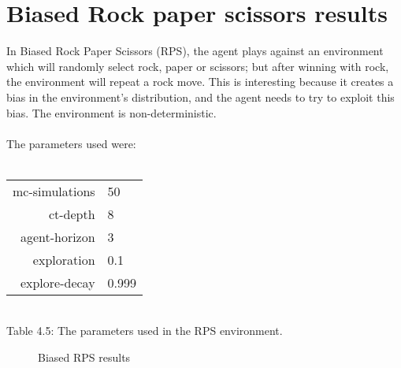 \documentclass[pdftex,twoside,a4paper]{report}
\begin{document}
\section{Biased Rock paper scissors results}
In Biased Rock Paper Scissors (RPS), the agent plays against an environment which will randomly select rock, paper or scissors; but after winning with rock, the environment will repeat a rock move. This is interesting because it creates a bias in the environment's distribution, and the agent needs to try to exploit this bias. The environment is non-deterministic.\\\\
The parameters used were:\\\\
\begin{center}
\begin{tabular}{| r | l | }
\hline
mc-simulations & 50\\
ct-depth & 8\\
agent-horizon & 3\\
exploration & 0.1\\
explore-decay & 0.999\\
\hline
\end{tabular}\\
\vspace{0.5mm}
Table 4.5: The parameters used in the RPS environment.
\end{center}

\begin{figure}[h]
  \begin{center}
  \end{center}
  \caption{Biased RPS results}
  \label{fig:rps_results}
\end{figure}
\end{document}
